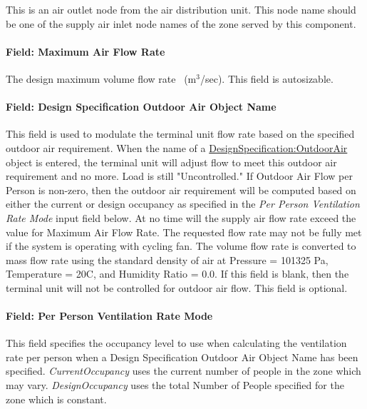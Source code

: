 This is an air outlet node from the air distribution unit. This node name should be one of the supply air inlet node names of the zone served by this component.

\paragraph{Field: Maximum Air Flow Rate}\label{field-maximum-air-flow-rate-1}

The design maximum volume flow rate~ (m\(^{3}\)/sec). This field is autosizable.

\paragraph{Field: Design Specification Outdoor Air Object Name}

This field is used to modulate the terminal unit flow rate based on the specified outdoor air requirement. When the name of a \hyperref[designspecificationoutdoorair]{DesignSpecification:OutdoorAir} object is entered, the terminal unit will adjust flow to meet this outdoor air requirement and no more. Load is still "Uncontrolled." If Outdoor Air Flow per Person is non-zero, then the outdoor air requirement will be computed based on either the current or design occupancy as specified in the \textit{Per Person Ventilation Rate Mode} input field below. At no time will the supply air flow rate exceed the value for Maximum Air Flow Rate. The requested flow rate may not be fully met if the system is operating with cycling fan. The volume flow rate is converted to mass flow rate using the standard density of air at Pressure = 101325 Pa, Temperature = 20C, and Humidity Ratio = 0.0. If this field is blank, then the terminal unit will not be controlled for outdoor air flow. This field is optional.

\paragraph{Field: Per Person Ventilation Rate Mode}\label{field-per-person-ventilation-rate-mode}

This field specifies the occupancy level to use when calculating the ventilation rate per person when a Design Specification Outdoor Air Object Name has been specified. \textit{CurrentOccupancy} uses the current number of people in the zone which may vary. \textit{DesignOccupancy} uses the total Number of People specified for the zone which is constant.

